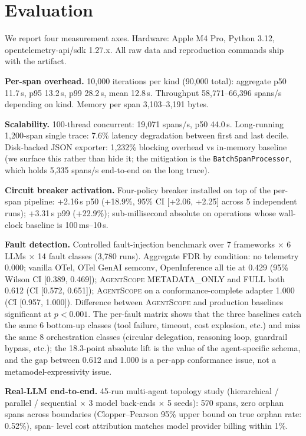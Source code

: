 \documentclass[sigplan,10pt,anonymous,review]{acmart}
\newcommand{\sysname}{\textsc{AgentScope}\xspace}
\begin{document}
\section*{Evaluation}

We report four measurement axes. Hardware: Apple M4 Pro, Python 3.12,
opentelemetry-api/sdk 1.27.x. All raw data and reproduction commands
ship with the artifact.

\textbf{Per-span overhead.} 10{,}000 iterations per kind (90{,}000
total): aggregate p50 11.7\,\textmu{}s, p95 13.2\,\textmu{}s, p99
28.2\,\textmu{}s, mean 12.8\,\textmu{}s. Throughput 58{,}771--66{,}396
spans/s depending on kind. Memory per span 3{,}103--3{,}191 bytes.

\textbf{Scalability.} 100-thread concurrent: 19{,}071 spans/s, p50
44.0\,\textmu{}s. Long-running 1{,}200-span single trace: 7.6\%
latency degradation between first and last decile. Disk-backed JSON
exporter: 1{,}232\% blocking overhead vs in-memory baseline (we surface
this rather than hide it; the mitigation is the
\texttt{BatchSpanProcessor}, which holds 5{,}335 spans/s end-to-end on
the long trace).

\textbf{Circuit breaker activation.} Four-policy breaker installed on
top of the per-span pipeline: +2.16\,\textmu{}s p50 (+18.9\%, 95\% CI
[+2.06, +2.25] across 5 independent runs);
+3.31\,\textmu{}s p99 (+22.9\%); sub-millisecond absolute on operations
whose wall-clock baseline is 100\,ms--10\,s.

\textbf{Fault detection.} Controlled fault-injection benchmark over
7 frameworks $\times$ 6 LLMs $\times$ 14 fault classes (3{,}780 runs).
Aggregate FDR by condition: no telemetry 0.000; vanilla OTel,
OTel GenAI semconv, OpenInference all tie at 0.429
(95\% Wilson CI [0.389, 0.469]); \sysname{} METADATA\_ONLY and FULL
both 0.612 (CI [0.572, 0.651]); \sysname{} on a conformance-complete
adapter 1.000 (CI [0.957, 1.000]). Difference between \sysname{} and
production baselines significant at $p<0.001$. The per-fault matrix
shows that the three baselines catch the same 6 bottom-up classes
(tool failure, timeout, cost explosion, etc.) and miss the same 8
orchestration classes (circular delegation, reasoning loop,
guardrail bypass, etc.); the 18.3-point absolute lift is the value of
the agent-specific schema, and the gap between 0.612 and 1.000 is a
per-app conformance issue, not a metamodel-expressivity issue.

\textbf{Real-LLM end-to-end.} 45-run multi-agent topology study
(hierarchical / parallel / sequential $\times$ 3 model back-ends
$\times$ 5 seeds): 570 spans, zero orphan spans across boundaries
(Clopper--Pearson 95\% upper bound on true orphan rate: 0.52\%), span-
level cost attribution matches model provider billing within 1\%.
\end{document}
